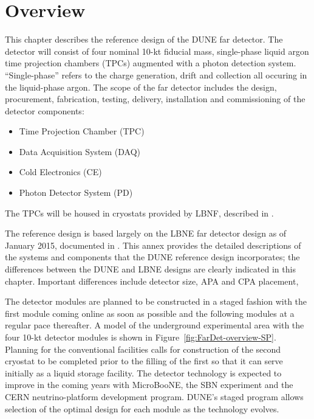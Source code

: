 \section{Overview}
\label{sec:detectors-fd-ref-ov}


This chapter describes the reference design of the DUNE far detector.  The detector will consist of four nominal 10-kt fiducial mass, single-phase liquid argon time projection chambers (TPCs) augmented with a photon detection system.  ``Single-phase'' refers to the charge generation, drift and collection all occuring in the liquid-phase argon. 
%
The scope of the far detector includes the design, procurement, fabrication, testing, delivery, installation and commissioning of the detector components: 

\begin{itemize}
\item Time Projection Chamber (TPC)
\item Data Acquisition System (DAQ)  
\item Cold Electronics (CE)
\item Photon Detector System (PD)
\end{itemize}
The TPCs will be housed in cryostats provided by LBNF, described in \vollbnf.

The reference design is based largely on the LBNE far detector design as of January 2015, documented in \anxlbnefd. This annex provides the detailed descriptions of the systems and components that the DUNE reference design incorporates; the differences between the DUNE and LBNE designs are clearly indicated in this chapter. Important differences include detector size, APA and CPA placement,  


The detector modules are planned to be constructed in a staged fashion with the first module coming online as soon as possible and the following modules at a regular pace thereafter. A model of the underground experimental area with the four 10-kt detector modules is shown in Figure~\ref{fig:FarDet-overview-SP}. Planning for the conventional facilities calls for construction of the second cryostat to be completed prior to the filling of the first so that it can serve initially as a liquid storage facility. 
The detector technology is expected to improve in the coming years with MicroBooNE, the SBN experiment and the CERN neutrino-platform development program. DUNE's staged program allows selection of the optimal design for each module as the technology evolves.  %

